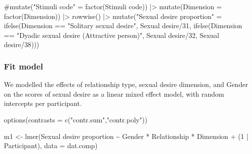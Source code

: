 \documentclass[
  bookmarksnumbered]{article}
\newenvironment{Shaded}{\begin{snugshade}}{\end{snugshade}}
\newcommand{\AttributeTok}[1]{\textcolor[rgb]{0.80,0.80,0.80}{#1}}
\newcommand{\CommentTok}[1]{\textcolor[rgb]{0.50,0.62,0.50}{#1}}
\newcommand{\DecValTok}[1]{\textcolor[rgb]{0.86,0.86,0.80}{#1}}
\newcommand{\FunctionTok}[1]{\textcolor[rgb]{0.94,0.94,0.56}{#1}}
\newcommand{\NormalTok}[1]{\textcolor[rgb]{0.80,0.80,0.80}{#1}}
\newcommand{\OtherTok}[1]{\textcolor[rgb]{0.94,0.94,0.56}{#1}}
\newcommand{\SpecialCharTok}[1]{\textcolor[rgb]{0.86,0.64,0.64}{#1}}
\newcommand{\StringTok}[1]{\textcolor[rgb]{0.80,0.58,0.58}{#1}}
\begin{document}
\begin{Shaded}
\begin{Highlighting}[]
  \CommentTok{\#mutate("Stimuli code" = factor(\textasciigrave{}Stimuli code\textasciigrave{})) |\textgreater{}}
  \FunctionTok{mutate}\NormalTok{(}\AttributeTok{Dimension =} \FunctionTok{factor}\NormalTok{(Dimension)) }\SpecialCharTok{|\textgreater{}} 
  \FunctionTok{rowwise}\NormalTok{() }\SpecialCharTok{|\textgreater{}} 
  \FunctionTok{mutate}\NormalTok{(}\StringTok{"Sexual desire proportion"} \OtherTok{=} 
           \FunctionTok{ifelse}\NormalTok{(Dimension }\SpecialCharTok{==} \StringTok{"Solitary sexual desire"}\NormalTok{, }
                  \StringTok{\textasciigrave{}}\AttributeTok{Sexual desire}\StringTok{\textasciigrave{}}\SpecialCharTok{/}\DecValTok{31}\NormalTok{,}
                  \FunctionTok{ifelse}\NormalTok{(Dimension }\SpecialCharTok{==} \StringTok{"Dyadic sexual desire (Attractive person)"}\NormalTok{, }
                         \StringTok{\textasciigrave{}}\AttributeTok{Sexual desire}\StringTok{\textasciigrave{}}\SpecialCharTok{/}\DecValTok{32}\NormalTok{, }
                         \StringTok{\textasciigrave{}}\AttributeTok{Sexual desire}\StringTok{\textasciigrave{}}\SpecialCharTok{/}\DecValTok{38}\NormalTok{)))}
\end{Highlighting}
\end{Shaded}

\hypertarget{fit-model}{%
\subsubsection{Fit model}\label{fit-model}}

We modelled the effects of relationship type, sexual desire dimension, and Gender on the scores of sexual desire as a linear mixed effect model, with random intercepts per participant.

\begin{Shaded}
\begin{Highlighting}[]
\FunctionTok{options}\NormalTok{(}\AttributeTok{contrasts =} \FunctionTok{c}\NormalTok{(}\StringTok{"contr.sum"}\NormalTok{,}\StringTok{"contr.poly"}\NormalTok{))}

\NormalTok{m1 }\OtherTok{\textless{}{-}} \FunctionTok{lmer}\NormalTok{(}\StringTok{\textasciigrave{}}\AttributeTok{Sexual desire proportion}\StringTok{\textasciigrave{}} \SpecialCharTok{\textasciitilde{}}\NormalTok{ Gender }\SpecialCharTok{*}\NormalTok{ Relationship }\SpecialCharTok{*}\NormalTok{ Dimension }\SpecialCharTok{+} 
\NormalTok{            (}\DecValTok{1} \SpecialCharTok{|}\NormalTok{ Participant), }
            \AttributeTok{data =}\NormalTok{ dat.comp)}
\end{Highlighting}
\end{Shaded}
\end{document}
